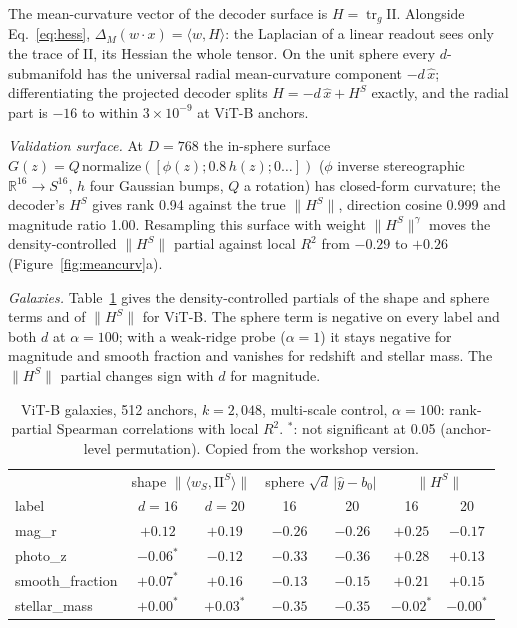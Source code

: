 \documentclass[10pt]{article}
\newcommand{\Htan}{H^{S}}
\newcommand{\norm}[1]{\lVert #1 \rVert}
\newcommand{\II}{\mathrm{II}}
\begin{document}
The mean-curvature vector of the decoder surface is $H=\operatorname{tr}_g\II$. Alongside Eq.~\eqref{eq:hess}, $\Delta_M(w\cdot x)=\langle w,H\rangle$: the Laplacian of a linear readout sees only the trace of $\II$, its Hessian the whole tensor. On the unit sphere every $d$-submanifold has the universal radial mean-curvature component $-d\,\hat x$; differentiating the projected decoder splits $H=-d\,\hat x+\Htan$ exactly, and the radial part is $-16$ to within $3\times10^{-9}$ at ViT-B anchors. %

\emph{Validation surface.} At $D=768$ the in-sphere surface $G(z)=Q\,\mathrm{normalize}([\phi(z);0.8\,h(z);0\ldots])$ ($\phi$ inverse stereographic $\mathbb{R}^{16}\to S^{16}$, $h$ four Gaussian bumps, $Q$ a rotation) has closed-form curvature; the decoder's $\Htan$ gives rank 0.94 against the true $\norm{\Htan}$, direction cosine 0.999 and magnitude ratio 1.00. Resampling this surface with weight $\norm{\Htan}^\gamma$ moves the density-controlled $\norm{\Htan}$ partial against local $R^2$ from $-0.29$ to $+0.26$ (Figure~\ref{fig:meancurv}a).

\emph{Galaxies.} Table~\ref{tab:meancurv} gives the density-controlled partials of the shape and sphere terms and of $\norm{\Htan}$ for ViT-B. The sphere term is negative on every label and both $d$ at $\alpha=100$; with a weak-ridge probe ($\alpha=1$) it stays negative for magnitude and smooth fraction and vanishes for redshift and stellar mass. The $\norm{\Htan}$ partial changes sign with $d$ for magnitude.

\begin{table}[h]
\centering\footnotesize\setlength{\tabcolsep}{4pt}
\begin{tabular}{lcccccc}
\toprule
 & \multicolumn{2}{c}{shape $\norm{\langle w_S,\II^S\rangle}$} & \multicolumn{2}{c}{sphere $\sqrt d\,|\hat y-b_0|$} & \multicolumn{2}{c}{$\norm{\Htan}$} \\
label & $d{=}16$ & $d{=}20$ & 16 & 20 & 16 & 20 \\
\midrule
mag\_r & $+0.12$ & $+0.19$ & $-0.26$ & $-0.26$ & $+0.25$ & $-0.17$ \\
photo\_z & $-0.06^{*}$ & $-0.12$ & $-0.33$ & $-0.36$ & $+0.28$ & $+0.13$ \\
smooth\_fraction & $+0.07^{*}$ & $+0.16$ & $-0.13$ & $-0.15$ & $+0.21$ & $+0.15$ \\
stellar\_mass & $+0.00^{*}$ & $+0.03^{*}$ & $-0.35$ & $-0.35$ & $-0.02^{*}$ & $-0.00^{*}$ \\
\bottomrule
\end{tabular}
\caption{ViT-B galaxies, 512 anchors, $k=2{,}048$, multi-scale control, $\alpha=100$: rank-partial Spearman correlations with local $R^2$. $^*$: not significant at 0.05 (anchor-level permutation). Copied from the workshop version.}
\label{tab:meancurv}
\end{table}
\end{document}
